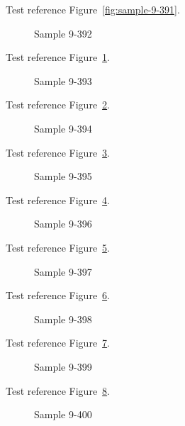 Test reference Figure~\ref{fig:sample-9-391}.

\begin{figure}[tbhp]
\caption{Sample 9-392}
\label{fig:sample-9-392}
\end{figure}

Test reference Figure~\ref{fig:sample-9-392}.

\begin{figure}[tbhp]
\caption{Sample 9-393}
\label{fig:sample-9-393}
\end{figure}

Test reference Figure~\ref{fig:sample-9-393}.

\begin{figure}[tbhp]
\caption{Sample 9-394}
\label{fig:sample-9-394}
\end{figure}

Test reference Figure~\ref{fig:sample-9-394}.

\begin{figure}[tbhp]
\caption{Sample 9-395}
\label{fig:sample-9-395}
\end{figure}

Test reference Figure~\ref{fig:sample-9-395}.

\begin{figure}[tbhp]
\caption{Sample 9-396}
\label{fig:sample-9-396}
\end{figure}

Test reference Figure~\ref{fig:sample-9-396}.

\begin{figure}[tbhp]
\caption{Sample 9-397}
\label{fig:sample-9-397}
\end{figure}

Test reference Figure~\ref{fig:sample-9-397}.

\begin{figure}[tbhp]
\caption{Sample 9-398}
\label{fig:sample-9-398}
\end{figure}

Test reference Figure~\ref{fig:sample-9-398}.

\begin{figure}[tbhp]
\caption{Sample 9-399}
\label{fig:sample-9-399}
\end{figure}

Test reference Figure~\ref{fig:sample-9-399}.

\begin{figure}[tbhp]
\caption{Sample 9-400}
\label{fig:sample-9-400}
\end{figure}

